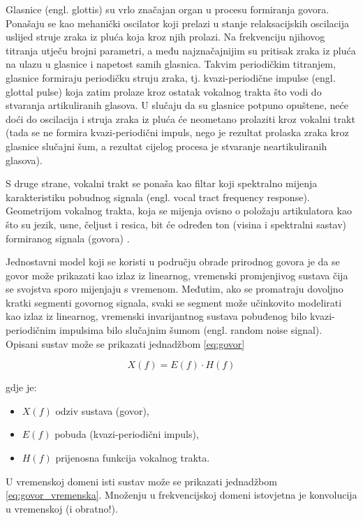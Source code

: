 Glasnice (engl. glottis) su vrlo značajan organ u procesu formiranja govora. 
Ponašaju se kao mehanički
oscilator koji prelazi u stanje relaksacijskih oscilacija uslijed struje zraka iz pluća koja kroz njih
prolazi. Na frekvenciju njihovog titranja utječu brojni parametri, a među najznačajnijim su
pritisak zraka iz pluća na ulazu u glasnice i napetost samih glasnica.
Takvim periodičkim titranjem, glasnice formiraju periodičku struju zraka, tj. 
kvazi-periodične impulse (engl. glottal pulse) koja zatim prolaze kroz ostatak 
vokalnog trakta što vodi do stvaranja artikuliranih glasova. U slučaju da 
su glasnice potpuno opuštene, neće
doći do oscilacija i struja zraka iz pluća će neometano prolaziti kroz vokalni trakt 
(tada se ne formira kvazi-periodični impuls, nego je rezultat prolaska zraka kroz glasnice
slučajni šum, a rezultat cijelog procesa je stvaranje neartikuliranih glasova). 

S druge strane, vokalni trakt se ponaša kao filtar koji spektralno mijenja karakteristiku
pobudnog signala (engl. vocal tract frequency response). 
Geometrijom vokalnog trakta, koja se mijenja ovisno o položaju 
artikulatora kao što su jezik, usne, čeljust i resica, bit će određen ton (visina i
spektralni sastav) formiranog signala (govora) \cite{petrinovic2002}. 

Jednostavni model koji se koristi u području obrade prirodnog govora je da se govor 
može prikazati kao izlaz iz linearnog, vremenski promjenjivog sustava čija se 
svojstva sporo mijenjaju s vremenom. Međutim, ako se promatraju dovoljno kratki
segmenti govornog signala, svaki se segment može učinkovito modelirati kao izlaz
iz linearnog, vremenski invarijantnog sustava pobuđenog bilo
kvazi-periodičnim impulsima bilo slučajnim šumom (engl. random noise signal).
Opisani sustav može se prikazati jednadžbom \ref{eq:govor}

\begin{equation}
    X(f) = E(f) \cdot H(f)
    \label{eq:govor}
\end{equation}

gdje je:
\begin{itemize}
    \item \(X(f)\) odziv sustava (govor),
    \item \(E(f)\) pobuda (kvazi-periodični impuls),
    \item \(H(f)\) prijenosna funkcija vokalnog trakta.
\end{itemize}

U vremenskoj domeni isti sustav može se prikazati jednadžbom \ref{eq:govor_vremenska}.
Množenju u frekvencijskoj domeni istovjetna je konvolucija u vremenskoj (i obratno!).

